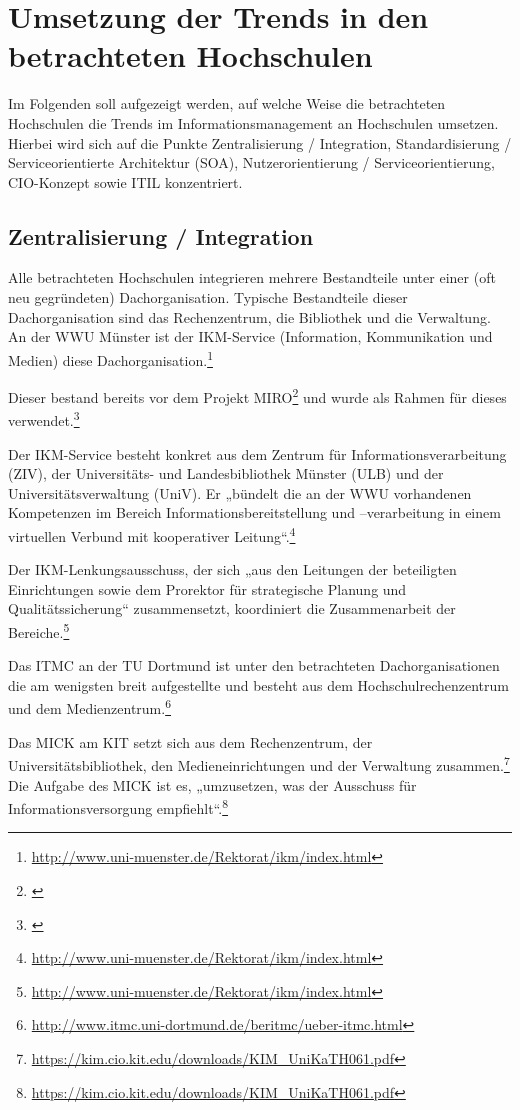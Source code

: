 \section{Umsetzung der Trends in den betrachteten Hochschulen}
Im Folgenden soll aufgezeigt werden, auf welche Weise die betrachteten Hochschulen die Trends im Informationsmanagement an Hochschulen umsetzen. Hierbei wird sich auf die Punkte Zentralisierung / Integration, Standardisierung / Serviceorientierte Architektur (SOA), Nutzerorientierung / Serviceorientierung, CIO-Konzept sowie ITIL konzentriert.

\subsection{Zentralisierung / Integration}
\label{subsection_zentralisierung_integration}
Alle betrachteten Hochschulen integrieren mehrere Bestandteile unter einer (oft neu gegründeten) Dachorganisation. Typische Bestandteile dieser Dachorganisation sind das Rechenzentrum, die Bibliothek und die Verwaltung.
An der WWU Münster ist der IKM-Service (Information, Kommunikation und Medien) diese Dachorganisation.\footnote{\url{http://www.uni-muenster.de/Rektorat/ikm/index.html}}

Dieser bestand bereits vor dem Projekt MIRO\footnote{\cite[8]{vogl_bericht_2013}} und wurde als Rahmen für dieses verwendet.\footnote{\cite[47]{bode_informationsmanagement_2010}}

Der IKM-Service besteht konkret aus dem Zentrum für Informationsverarbeitung (ZIV), der Universitäts- und Landesbibliothek Münster (ULB) und der Universitätsverwaltung (UniV). Er „bündelt die an der WWU vorhandenen Kompetenzen im Bereich Informationsbereitstellung und –verarbeitung in einem virtuellen Verbund mit kooperativer Leitung“.\footnote{\url{http://www.uni-muenster.de/Rektorat/ikm/index.html}}

Der IKM-Lenkungsausschuss, der sich „aus den Leitungen der beteiligten Einrichtungen sowie dem Prorektor für strategische Planung und Qualitätssicherung“ zusammensetzt, koordiniert die Zusammenarbeit der Bereiche.\footnote{\url{http://www.uni-muenster.de/Rektorat/ikm/index.html}}

Das ITMC an der TU Dortmund ist unter den betrachteten Dachorganisationen die am wenigsten breit aufgestellte und besteht aus dem Hochschulrechenzentrum und dem Medienzentrum.\footnote{\url{http://www.itmc.uni-dortmund.de/beritmc/ueber-itmc.html}}

Das MICK am KIT setzt sich aus dem Rechenzentrum, der Universitätsbibliothek, den Medieneinrichtungen und der Verwaltung zusammen.\footnote{\url{https://kim.cio.kit.edu/downloads/KIM_UniKaTH061.pdf}} Die Aufgabe des MICK ist es, „umzusetzen, was der Ausschuss für Informationsversorgung empfiehlt“.\footnote{\url{https://kim.cio.kit.edu/downloads/KIM_UniKaTH061.pdf}}

